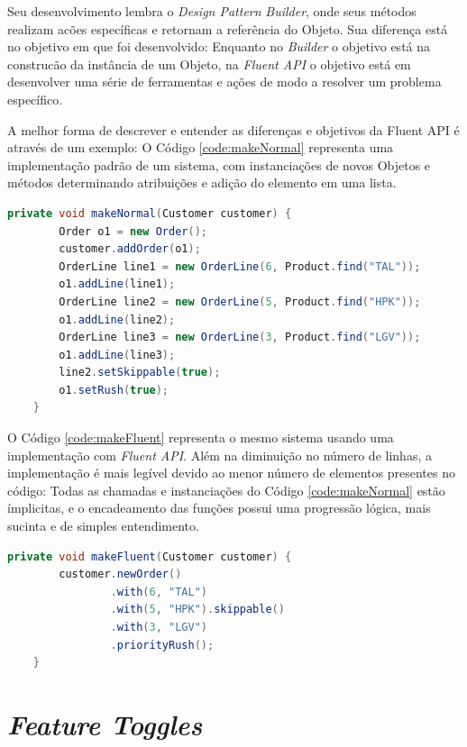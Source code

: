 \documentclass[portugues]{ic-tese}
\begin{document}
Seu desenvolvimento lembra o \textit{Design Pattern} \textit{Builder}, onde seus métodos realizam acões específicas e retornam a referência do Objeto. Sua diferença está no objetivo em que foi desenvolvido: Enquanto no \textit{Builder} o objetivo está na construcão da instância de um Objeto, na \textit{Fluent API} o objetivo está em desenvolver uma série de ferramentas e ações de modo a resolver um problema específico.

A melhor forma de descrever e entender as diferenças e objetivos da Fluent API é através de um exemplo: O Código \ref{code:makeNormal} representa uma implementação padrão de um sistema, com instanciações de novos Objetos e métodos determinando atribuições e adição do elemento em uma lista.

\begin{lstlisting}[language=Java, label={code:makeNormal}, caption=Implementação padrão presente em um sistema~\citep{Fowler_2005}]
    private void makeNormal(Customer customer) {
        Order o1 = new Order();
        customer.addOrder(o1);
        OrderLine line1 = new OrderLine(6, Product.find("TAL"));
        o1.addLine(line1);
        OrderLine line2 = new OrderLine(5, Product.find("HPK"));
        o1.addLine(line2);
        OrderLine line3 = new OrderLine(3, Product.find("LGV"));
        o1.addLine(line3);
        line2.setSkippable(true);
        o1.setRush(true);
    }
\end{lstlisting}

O Código \ref{code:makeFluent} representa o mesmo sistema usando uma implementação com \textit{Fluent API}. Além na diminuição no número de linhas, a implementação é mais legível devido ao menor número de elementos presentes no código: Todas as chamadas e instanciações do Código \ref{code:makeNormal} estão ímplicitas, e o encadeamento das funções possui uma progressão lógica, mais sucinta e de simples entendimento.

\begin{lstlisting}[language=Java, label={code:makeFluent}, caption=Implementação com o uso de \textit{Fluent API}~\citep{Fowler_2005}]
   private void makeFluent(Customer customer) {
        customer.newOrder()
                .with(6, "TAL")
                .with(5, "HPK").skippable()
                .with(3, "LGV")
                .priorityRush();
    }
\end{lstlisting}

\section{\textit{Feature Toggles}}
\label{app:FeatureToggles}
\end{document}
